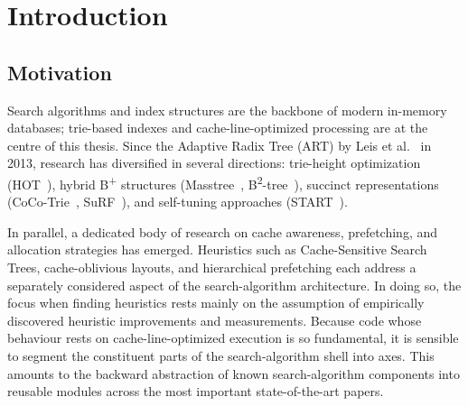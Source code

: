 \chapter{Introduction}\label{ch:intro}

\section{Motivation}\label{sec:motivation}

Search algorithms and index structures are the backbone of modern in-memory databases; trie-based
indexes and cache-line-optimized processing are at the centre of this thesis. Since the Adaptive
Radix Tree (ART) by Leis et al.~\cite{leis2013art} in 2013, research has diversified in several
directions: trie-height optimization (HOT~\cite{binna2018hot}), hybrid B\textsuperscript{+}
structures (Masstree~\cite{mao2012masstree}, B\textsuperscript{2}-tree~\cite{schmeisser2022b2tree}),
succinct representations (CoCo-Trie~\cite{boffa2024coco}, SuRF~\cite{zhang2018surf}), and
self-tuning approaches (START~\cite{fent2020start}).

In parallel, a dedicated body of research on cache awareness, prefetching, and allocation strategies
has emerged. Heuristics such as Cache-Sensitive Search Trees, cache-oblivious layouts, and
hierarchical prefetching each address a separately considered aspect of the search-algorithm
architecture. In doing so, the focus when finding heuristics rests mainly on the assumption of
empirically discovered heuristic improvements and measurements. Because code whose behaviour rests
on cache-line-optimized execution is so fundamental, it is sensible to segment the constituent parts
of the search-algorithm shell into axes. This amounts to the backward abstraction of known
search-algorithm components into reusable modules across the most important state-of-the-art papers.

